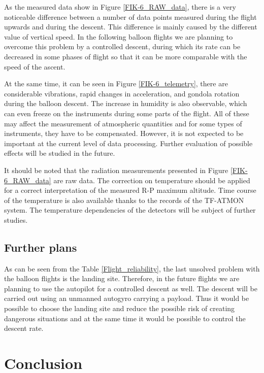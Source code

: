 \documentclass{Rpd}
\begin{document}
As the measured data show in Figure \ref{FIK-6_RAW_data}, there is a very noticeable difference between a number of data points measured during the flight upwards and during the descent. This difference is mainly caused by the  different value of vertical speed. In the following balloon flights we are planning to overcome this problem by a controlled descent, during which its rate can be decreased in some phases of flight so that it can be more comparable with the speed of the ascent.

At the same time, it can be seen in Figure \ref{FIK-6_telemetry}, there are considerable vibrations, rapid changes in acceleration, and gondola rotation during the balloon descent. The increase in humidity is also observable, which can even freeze on the instruments during some parts of the flight. All of these may affect the measurement of atmospheric quantities and for some types of instruments, they have to be compensated. However, it is not expected to be important at the current level of data processing. Further evaluation of possible effects will be studied in the future.

It should be noted that the radiation measurements presented in Figure \ref{FIK-6_RAW_data} are raw data. The correction on temperature should be applied for a correct interpretation of the measured R-P maximum altitude. Time course of the temperature is also available thanks to the records of the TF-ATMON system. The temperature dependencies of the detectors  will be subject of further studies.


\subsection{Further plans}

As can be seen from the Table \ref{Flight_reliability}, the last unsolved problem with the balloon flights is the landing site. Therefore, in the future flights we are planning to use the autopilot for a controlled descent as well.
The descent will be carried out using an unmanned autogyro carrying a payload. Thus it would be possible to choose the landing site and reduce the possible risk of creating dangerous situations and at the same time it would be possible to control the descent rate. 

\section{Conclusion}
\end{document}

